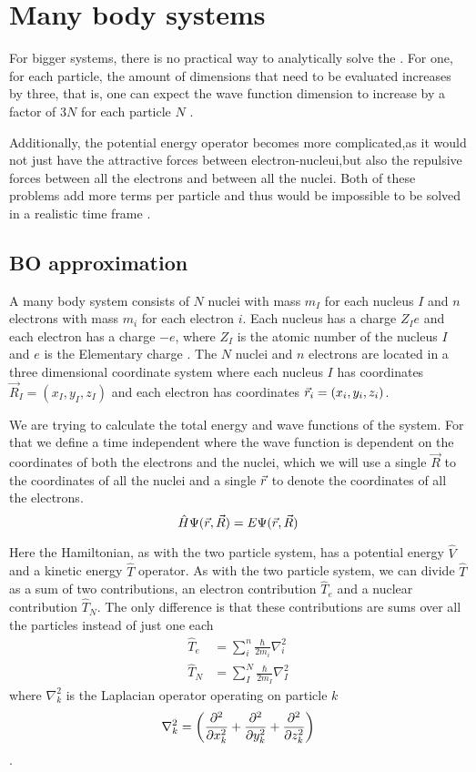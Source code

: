 \documentclass[../master_thesis.tex]{subfiles}
\begin{document}
\section{Many body systems}

For bigger systems, there is no practical way to analytically solve the
\SE \cite{Jensen:2017}. For one, for each particle, the amount of dimensions that need to be
evaluated increases by three, that is, one can expect the wave function
dimension to increase by a factor of $3N$ for each particle $N$
\cite{Cramer:2004}.

Additionally, the potential energy operator becomes more complicated,as it
would not just have the attractive forces between electron-nucleui,but also the
repulsive forces between all the electrons and between all the nuclei. Both of
these problems add more terms per particle and thus would be impossible to be
solved in a realistic time frame \cite{Jensen:2017}.

\subsection{\ac{BO} approximation} \label{BO}
A many body system consists of $N$ nuclei with mass $m_I$ for each nucleus $I$
and $n$ electrons with mass $m_i$ for each electron $i$. Each nucleus has a
charge $Z_Ie$ and each electron has a charge $-e$, where $Z_I$ is the atomic
number of the nucleus $I$  and $e$ is the Elementary charge \cite{Atkins:2014}. The $N$ nuclei and $n$
electrons are located in a three dimensional coordinate system where each nucleus $I$ has
coordinates $\vec{R}_I = (x_I, y_I, z_I)$ and each electron has coordinates
$\vec{r}_i = (x_i, y_i, z_i)$.

We are trying to calculate the total energy and wave functions of the system. For
that we define a time independent \SE where the wave function is dependent on
the coordinates of both the electrons and the nuclei, which we will use a single $\vec{R}$
to the coordinates of all the nuclei and a single $\vec{r}$ to denote the coordinates
of all the electrons.
\begin{equation}\label{eq:totalheliumSE}
  \hat{H}\Psi(\vec{r}, \vec{R}) = E \Psi(\vec{r}, \vec{R})
\end{equation}

Here the Hamiltonian, as with the two particle system, has a potential energy $\hat{V}$ and a
kinetic energy $\hat{T}$ operator. As with the two particle system, we can divide $\hat{T}$ as
a sum of two contributions, an electron contribution $\hat{T}_e$ and a nuclear contribution
$\hat{T}_N$. The only difference is that these contributions are sums over all
the particles  instead of just one each\cite{Cramer:2004}
\begin{align}
  \hat{T}_e &= \sum_i^n \frac{\hbar}{2m_i}\nabla^2_i\\
  \hat{T}_N &= \sum_I^N \frac{\hbar}{2m_I}\nabla^2_I
\end{align}
where $\nabla^2_k$ is the Laplacian operator operating on particle $k$
\begin{equation}
  \nabla^2_k = \left( \frac{\partial^2}{\partial x_k^2} + \frac{\partial^2}{\partial y_k^2} + \frac{\partial^2}{\partial z_k^2} \right)
\end{equation}.
\end{document}

